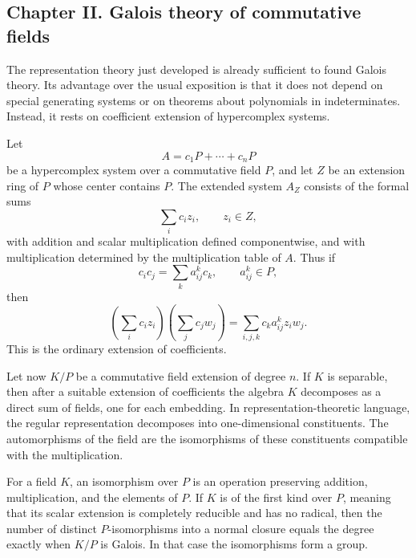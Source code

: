 \documentclass[11pt]{article}
\begin{document}
\subsection{Chapter II. Galois theory of commutative fields}

The representation theory just developed is already sufficient to found Galois theory. Its advantage over the usual exposition is that it does not depend on special generating systems or on theorems about polynomials in indeterminates. Instead, it rests on coefficient extension of hypercomplex systems.

Let
\[
  A=c_1P+
\cdots+c_nP
\]
be a hypercomplex system over a commutative field \(P\), and let \(Z\) be an extension ring of \(P\) whose center contains \(P\). The extended system \(A_Z\) consists of the formal sums
\[
  \sum_i c_i z_i,
  \qquad z_i\in Z,
\]
with addition and scalar multiplication defined componentwise, and with multiplication determined by the multiplication table of \(A\). Thus if
\[
  c_ic_j=\sum_k a_{ij}^k c_k,
  \qquad a_{ij}^k\in P,
\]
then
\[
  \left(\sum_i c_i z_i\right)
  \left(\sum_j c_j w_j\right)
  =\sum_{i,j,k} c_k a_{ij}^k z_iw_j.
\]
This is the ordinary extension of coefficients.

Let now \(K/P\) be a commutative field extension of degree \(n\). If \(K\) is separable, then after a suitable extension of coefficients the algebra \(K\) decomposes as a direct sum of fields, one for each embedding. In representation-theoretic language, the regular representation decomposes into one-dimensional constituents. The automorphisms of the field are the isomorphisms of these constituents compatible with the multiplication.

For a field \(K\), an isomorphism over \(P\) is an operation preserving addition, multiplication, and the elements of \(P\). If \(K\) is of the first kind over \(P\), meaning that its scalar extension is completely reducible and has no radical, then the number of distinct \(P\)-isomorphisms into a normal closure equals the degree exactly when \(K/P\) is Galois. In that case the isomorphisms form a group.
\end{document}
